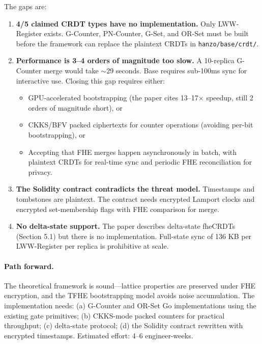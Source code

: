 \documentclass{../shared/luxfhe}
\begin{document}
The gaps are:

\begin{enumerate}[noitemsep]
\item \textbf{4/5 claimed CRDT types have no implementation.}
      Only LWW-Register exists.  G-Counter, PN-Counter, G-Set, and OR-Set
      must be built before the framework can replace the plaintext CRDTs
      in \texttt{hanzo/base/crdt/}.

\item \textbf{Performance is 3--4 orders of magnitude too slow.}
      A 10-replica G-Counter merge would take $\sim$29 seconds.
      Base requires sub-100ms sync for interactive use.
      Closing this gap requires either:
      \begin{itemize}[noitemsep]
        \item GPU-accelerated bootstrapping (the paper cites 13--17$\times$
              speedup, still 2 orders of magnitude short), or
        \item CKKS/BFV packed ciphertexts for counter operations
              (avoiding per-bit bootstrapping), or
        \item Accepting that FHE merges happen asynchronously in batch,
              with plaintext CRDTs for real-time sync and periodic
              FHE reconciliation for privacy.
      \end{itemize}

\item \textbf{The Solidity contract contradicts the threat model.}
      Timestamps and tombstones are plaintext.  The contract needs
      encrypted Lamport clocks and encrypted set-membership flags
      with FHE comparison for merge.

\item \textbf{No delta-state support.}  The paper describes delta-state
      fheCRDTs (Section 5.1) but there is no implementation.  Full-state
      sync of 136 KB per LWW-Register per replica is prohibitive at scale.
\end{enumerate}

\paragraph{Path forward.}
The theoretical framework is sound---lattice properties are preserved
under FHE encryption, and the TFHE bootstrapping model avoids noise
accumulation.  The implementation needs:
(a) G-Counter and OR-Set Go implementations using the existing gate
primitives;
(b) CKKS-mode packed counters for practical throughput;
(c) delta-state protocol;
(d) the Solidity contract rewritten with encrypted timestamps.
Estimated effort: 4--6 engineer-weeks.
\end{document}
